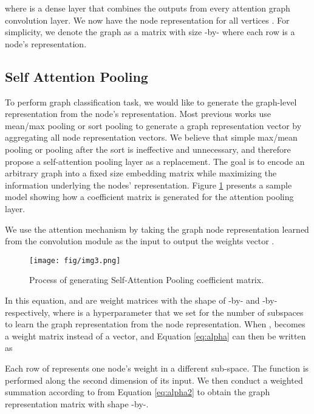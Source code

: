 \documentclass[conference]{IEEEtran}
\begin{document}
		
		
		
		where  is a dense layer that combines the outputs from every attention graph convolution layer.  We now have the node representation  for all vertices . For simplicity, we denote the graph as a matrix  with size -by- where each row is a node's representation.
		
			
		
		\subsection{Self Attention Pooling}To perform graph classification task, we would like to generate the graph-level representation from the node's representation. Most previous works use mean/max pooling \cite{henaff2015deep} or sort pooling \cite{defferrard2016convolutional,zhang2018end} to generate a graph representation vector by aggregating all node representation vectors. We believe that simple max/mean pooling or pooling after the sort is ineffective and unnecessary, and therefore propose a self-attention pooling layer as a replacement. The goal is to encode an arbitrary graph into a fixed size embedding matrix while maximizing the information underlying the nodes' representation. Figure \ref{fig:pooling} presents a sample model showing how a coefficient matrix is generated for the attention pooling layer.
		
		We use the attention mechanism by taking the graph node representation learned from the convolution module as the input to output the weights vector . 
		
		\begin{figure}[b]
 	 	\centering
 	 		\texttt{[image: fig/img3.png]}
 	 		\caption{Process of generating Self-Attention Pooling coefficient matrix.}   
 	 	\label{fig:pooling}
		\end{figure}
		
		
		
		In this equation,  and  are weight matrices with the shape of -by- and -by- respectively, where  is a hyperparameter that we set for the number of subspaces to learn the graph representation from the node representation. When ,  becomes a weight matrix instead of a vector, and Equation \ref{eq:alpha} can then be written as
		
		
		
		Each row of  represents one node's weight in a different sub-space. The  function is performed along the second dimension of its input. We then conduct a weighted summation according to  from Equation \ref{eq:alpha2} to obtain the graph representation matrix  with shape -by-.
		
\end{document}
